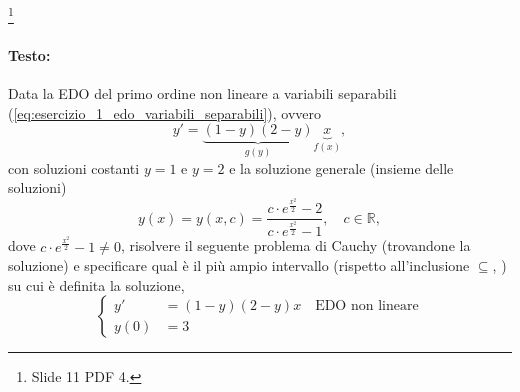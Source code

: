 \begin{example}\footnote{Slide 11 PDF 4.}
    \paragraph{Testo:} Data la EDO del primo ordine non lineare a variabili separabili (\ref{eq:esercizio_1_edo_variabili_separabili}), ovvero
    \begin{equation*}
        y' = \underbrace{(1-y)(2-y)}_{g(y)}\underbrace{x}_{f(x)},
    \end{equation*}
    con soluzioni costanti $y=1$ e $y=2$ e la soluzione generale (insieme delle soluzioni)
    \begin{equation}\label{eq:esercizio_1_intergrale_generale_problema_cauchy}
        y(x) = y(x,c)=\frac{c\cdot e^{\frac{x^2}{2}}-2}{c\cdot e^{\frac{x^2}{2}}-1},\quad c\in\mathbb R,
    \end{equation}
    dove $c\cdot e^{\frac{x^2}{2}}-1\neq 0$, risolvere il seguente problema di Cauchy (trovandone la soluzione) e specificare qual è il più ampio intervallo (rispetto all'inclusione $\subseteq$, \footnotemark) su cui è definita la soluzione,
    \begin{equation*}
        \begin{cases}
            y'&=(1-y)(2-y)x\quad\text{EDO non lineare}\\
            y(0) &= 3
        \end{cases}
    \end{equation*}
    

\end{example}
